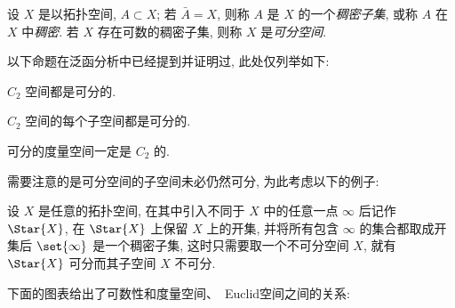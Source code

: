     \begin{Definition}[稠密, 可分空间]
        设 $ X $ 是以拓扑空间, $ A\subset X $; 若 $ \bar{A}=X $, 则称 $ A $ 是 $ X $ 的一个\emph{稠密子集}, 或称 $ A $ 在 $ X $ 中\emph{稠密}. 若 $ X $ 存在可数的稠密子集, 则称 $ X $ 是\emph{可分空间}.
    \end{Definition}

    以下命题在泛函分析中已经提到并证明过, 此处仅列举如下:

    \begin{Proposition}
        $ C_2 $ 空间都是可分的.
    \end{Proposition}
    
    \begin{Proposition}
        $ C_2 $ 空间的每个子空间都是可分的.
    \end{Proposition}

    \begin{Proposition}
        可分的度量空间一定是 $ C_2 $ 的.
    \end{Proposition}

    需要注意的是可分空间的子空间未必仍然可分, 为此考虑以下的例子:

    \begin{Example}
        设 $ X $ 是任意的拓扑空间, 在其中引入不同于 $ X $ 中的任意一点 $ \infty $ 后记作 $ \Star{X} $, 在 $ \Star{X} $ 上保留 $ X $ 上的开集, 并将所有包含 $ \infty $ 的集合都取成开集后 $ \set{\infty} $ 是一个稠密子集, 这时只需要取一个不可分空间 $ X $, 就有 $ \Star{X} $ 可分而其子空间 $ X $ 不可分. 
    \end{Example}

    下面的图表给出了可数性和度量空间、\, Euclid空间之间的关系:
    \begin{center}
    \end{center}    